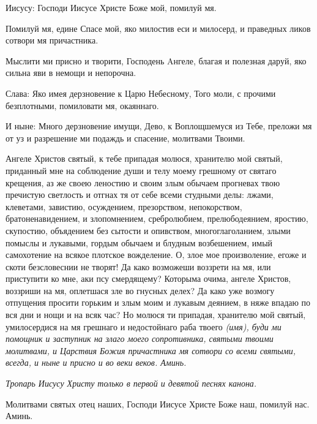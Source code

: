   Иисусу: Господи Иисусе Христе Боже мой, помилуй мя.


  Помилуй мя, едине Спасе мой, яко милостив еси и милосерд, и праведных ликов сотвори мя причастника.


  Мыслити ми присно и творити, Господень Aнгеле, благая и полезная даруй, яко сильна яви в немощи и непорочна.


  Слава: Яко имея дерзновение к Царю Небесному, Того моли, с прочими безплотными, помиловати мя, окаяннаго.


  И ныне: Много дерзновение имущи, Дево, к Воплощшемуся из Тебе, преложи мя от уз и разрешение ми подаждь и спасение, молитвами Твоими.




\medskip





  Ангеле Христов святый, к тебе припадая молюся, хранителю мой святый, приданный мне на соблюдение души и телу моему грешному от святаго крещения, аз же своею леностию и своим злым обычаем прогневах твою пречистую светлость и отгнах тя от себе всеми студными делы: лжами, клеветами, завистию, осуждением, презорством, непокорством, братоненавидением, и злопомнением, сребролюбием, прелюбодеянием, яростию, скупостию, объядением без сытости и опивством, многоглаголанием, злыми помыслы и лукавыми, гордым обычаем и блудным возбешением, имый самохотение на всякое плотское вожделение. О, злое мое произволение, егоже и скоти безсловеснии не творят! Да како возможеши воззрети на мя, или приступити ко мне, аки псу смердящему? Которыма очима, ангеле Христов, воззриши на мя, оплетшася зле во гнусных делех? Да како уже возмогу отпущения просити горьким и злым моим и лукавым деянием, в няже впадаю по вся дни и нощи и на всяк час? Но молюся ти припадая, хранителю мой святый, умилосердися на мя грешнаго и недостойнаго раба твоего \itshape (имя)\normalfont{}, буди ми помощник и заступник на злаго моего сопротивника, святыми твоими молитвами, и Царствия Божия причастника мя сотвори со всеми святыми, всегда, и ныне и присно и во веки веков. Аминь.




\itshape * Тропарь Иисусу Христу только в первой и девятой песнях канона.\normalfont{} \mychapterending

 


Молитвами святых отец наших, Господи Иисусе Христе Боже наш, помилуй нас. Аминь.


